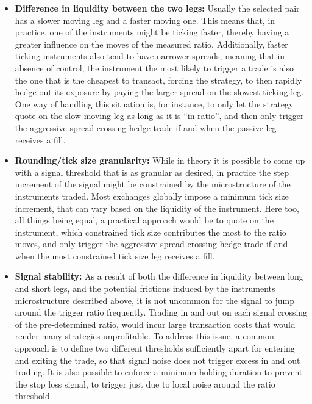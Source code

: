 \begin{itemize}
\item \textbf{Difference in liquidity between the two legs:} Usually the selected pair has a slower moving leg and a faster moving one. This means that, in practice, one of the instruments might be ticking faster, thereby having a greater influence on the moves of the measured ratio. Additionally, faster ticking instruments also tend to have narrower spreads, meaning that in absence of control, the instrument the most likely to trigger a trade is also the one that is the cheapest to transact, forcing the strategy, to then rapidly hedge out its exposure by paying the larger spread on the slowest ticking leg. One way of handling this situation is, for instance, to only let the strategy quote on the slow moving leg as long as it is ``in ratio'', and then only trigger the aggressive spread-crossing hedge trade if and when the passive leg receives a fill. 

\item \textbf{Rounding/tick size granularity:} While in theory it is possible to come up with a signal threshold that is as granular as desired, in practice the step increment of the signal might be constrained by the microstructure of the instruments traded. Most exchanges globally impose a minimum tick size increment, that can vary based on the liquidity of the instrument. Here too, all things being equal, a practical approach would be to quote on the instrument, which constrained tick size contributes the most to the ratio moves, and only trigger the aggressive spread-crossing hedge trade if and when the most constrained tick size leg receives a fill. 

\item \textbf{Signal stability:} As a result of both the difference in liquidity between long and short legs, and the potential frictions induced by the instruments microstructure described above, it is not uncommon for the signal to jump around the trigger ratio frequently. Trading in and out on each signal crossing of the pre-determined ratio, would incur large transaction costs that would render many strategies unprofitable. To address this issue, a common approach is to define two different thresholds sufficiently apart for entering and exiting the trade, so that signal noise does not trigger excess in and out trading. It is also possible to enforce a minimum holding duration to prevent the stop loss signal, to trigger just due to local noise around the ratio threshold. 


\end{itemize}
